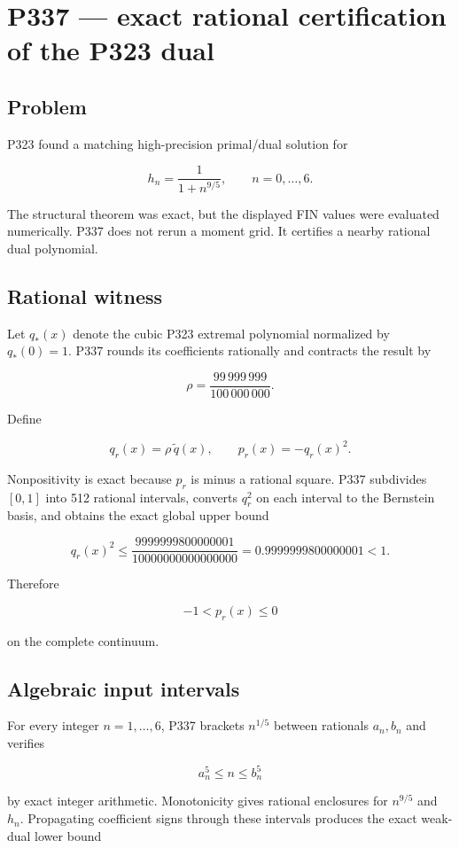 \documentclass[11pt,a4paper,openany]{report}
\begin{document}
\chapter{P337 --- exact rational certification of the P323 dual}

\section{Problem}

P323 found a matching high-precision primal/\allowbreak{}dual solution for

\[
h_n=\frac{1}{1+n^{9/5}},\qquad n=0,\ldots,6.
\]

The structural theorem was exact, but the displayed FIN values were evaluated numerically. P337 does not rerun a moment grid. It certifies a nearby rational dual polynomial.

\section{Rational witness}

Let \(q_*(x)\) denote the cubic P323 extremal polynomial normalized by \(q_*(0)=1\). P337 rounds its coefficients rationally and contracts the result by

\[
\rho=\frac{99\,999\,999}{100\,000\,000}.
\]

Define

\[
q_r(x)=\rho\,\widetilde q(x),
\qquad
p_r(x)=-q_r(x)^2.
\]

Nonpositivity is exact because \(p_r\) is minus a rational square. P337 subdivides \([0,1]\) into 512 rational intervals, converts \(q_r^2\) on each interval to the Bernstein basis, and obtains the exact global upper bound

\[
q_r(x)^2\leq
\frac{9999999800000001}{10000000000000000}
=0.9999999800000001<1.
\]

Therefore

\[
-1<p_r(x)\leq 0
\]

on the complete continuum.

\section{Algebraic input intervals}

For every integer \(n=1,\ldots,6\), P337 brackets \(n^{1/5}\) between rationals \(a_n,b_n\) and verifies

\[
a_n^5\leq n\leq b_n^5
\]

by exact integer arithmetic. Monotonicity gives rational enclosures for \(n^{9/5}\) and \(h_n\). Propagating coefficient signs through these intervals produces the exact weak-dual lower bound
\end{document}
